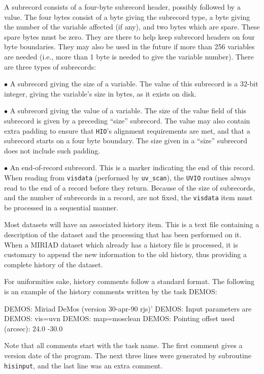 A subrecord consists of a four-byte subrecord header,
possibly followed by a value. The four bytes consist of a byte giving the
subrecord type, a byte giving the number of the variable affected (if
any), and two bytes which are spare. These spare bytes must be zero. They
are there to help keep subrecord headers on four byte boundaries. They may
also be used in the future if more than 256 variables are needed (i.e.,
more than 1 byte is needed to give the variable number). There are three
types of subrecords:
\item{$\bullet$} A subrecord giving the size of a variable. The value of
this subrecord is a 32-bit integer, giving the variable's size in bytes,
as it exists on disk.
\item{$\bullet$} A subrecord giving the value of a variable. The size of the
value field of this subrecord is given by a preceding ``size'' subrecord.
The value may also contain extra padding to ensure that {\tt HIO}'s
alignment requirements are met, and that a subrecord starts on a four byte
boundary. The size given in a ``size'' subrecord does not include such padding.
\item{$\bullet$} An end-of-record subrecord. This is a marker indicating the
end of this record. When reading from {\tt visdata} (performed by
{\tt uv\_scan}), the {\tt UVIO} routines always read to the end of a record
before they return.
Because of the size of subrecords, and the number of subrecords in a
record, are not fixed, the {\tt visdata} item must be processed in a sequential
manner.



Most datasets will have an associated history item.  This is a text file
containing a description of the dataset and the processing that has been
performed on it.  When a MIRIAD dataset which already has a history
file is processed, it is customary to append the new information to the
old history, thus providing a complete history of the dataset.

For uniformities sake, history comments follow a standard format. The
following is an example of the history comments written by the task
DEMOS:

{\ninepoint\begintt
DEMOS: Miriad DeMos (version 30-apr-90 rjs)'
DEMOS: Input parameters are
DEMOS:   vis=uvn
DEMOS:   map=mosclean
DEMOS: Pointing offset used (arcsec):   24.0 -30.0
\endtt}

Note that all comments start with the task name. The first comment gives a
version date of the program. The next three lines were generated by
subroutine {\tt hisinput}, and the last line was an extra comment.

